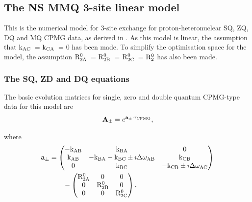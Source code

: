 
\subsection{The NS MMQ 3-site linear model}
\label{sect: dispersion: NS MMQ 3-site linear model}

This is the numerical model for 3-site exchange for proton-heteronuclear SQ, ZQ, DQ and MQ CPMG data, as derived in \citep{Korzhnev04a,Korzhnev04b,Korzhnev05b}.
As this model is linear, the assumption that $\textrm{k}_\textrm{AC}$~= $\textrm{k}_\textrm{CA}$~= 0 has been made.
To simplify the optimisation space for the model, the assumption $\mathrm{R}_\mathrm{2A}^0$~= $\mathrm{R}_\mathrm{2B}^0$~= $\mathrm{R}_\mathrm{2C}^0$~= $\mathrm{R}_2^0$ has also been made.


\subsubsection{The SQ, ZD and DQ equations}

The basic evolution matrices for single, zero and double quantum CPMG-type data for this model are
\begin{equation}
    \mathbf{A_\pm} = e^{\mathbf{a_\pm} \cdot \tau_\textrm{CPMG}},
\end{equation}

where
\begin{align}
    \mathbf{a_\pm} &= \begin{pmatrix}
                        -\textrm{k}_\textrm{AB} & \textrm{k}_\textrm{BA}                          & 0    \\
                        \textrm{k}_\textrm{AB}  & -\textrm{k}_\textrm{BA} -\textrm{k}_\textrm{BC} \pm\imath\Delta\omega_\textrm{AB}    & \textrm{k}_\textrm{CB} \\
                        0     & \textrm{k}_\textrm{BC}                          & -\textrm{k}_\textrm{CB} \pm\imath\Delta\omega_\textrm{AC}
                      \end{pmatrix}  \nonumber \\
                   &\qquad - \begin{pmatrix}
                               \mathrm{R}_\mathrm{2A}^0 & 0          & 0    \\
                               0          & \mathrm{R}_\mathrm{2B}^0 & 0    \\
                               0          & 0          & \mathrm{R}_\mathrm{2C}^0
                             \end{pmatrix}.
\end{align}


